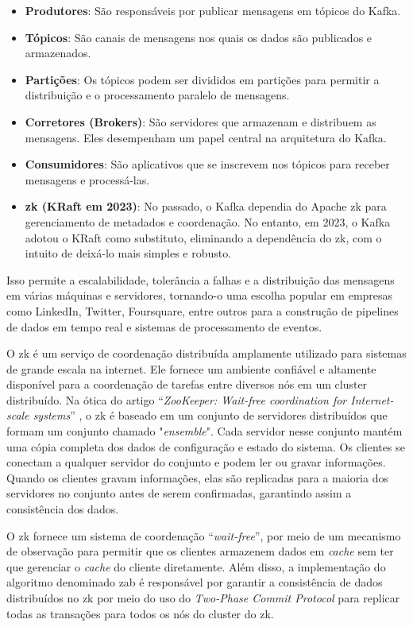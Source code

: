 \begin{itemize}
  \item \textbf{Produtores}: São responsáveis por publicar mensagens em tópicos do Kafka.
  \item \textbf{Tópicos}: São canais de mensagens nos quais os dados são publicados e armazenados.
  \item \textbf{Partições}: Os tópicos podem ser divididos em partições para permitir a distribuição e o processamento paralelo de mensagens.
  \item \textbf{Corretores (Brokers)}: São servidores que armazenam e distribuem as mensagens. Eles desempenham um papel central na arquitetura do Kafka.
  \item \textbf{Consumidores}: São aplicativos que se inscrevem nos tópicos para receber mensagens e processá-las.
  \item \textbf{\gls{zk} (KRaft em 2023)}: No passado, o Kafka dependia do Apache \gls{zk} para gerenciamento de metadados e coordenação. No entanto, em 2023, o Kafka adotou o KRaft como substituto, eliminando a dependência do \gls{zk}, com o intuito de deixá-lo mais simples e robusto.
\end{itemize}
Isso permite a escalabilidade, tolerância a falhas e a distribuição das mensagens em várias máquinas e servidores, tornando-o uma escolha popular em empresas como LinkedIn, Twitter, Foursquare, entre outros para a construção de pipelines de dados em tempo real e sistemas de processamento de eventos.

O \gls{zk} \cite{ZookeeperGitHub} é um serviço de coordenação distribuída amplamente utilizado para sistemas de grande escala na internet. Ele fornece um ambiente confiável e altamente disponível para a coordenação de tarefas entre diversos nós em um cluster distribuído. Na ótica do artigo ``\textit{ZooKeeper: Wait-free coordination for Internet-scale systems}'' \cite{ZooKeeperWaitFree:2010}, o \gls{zk} é baseado em um conjunto de servidores distribuídos que formam um conjunto chamado "\textit{ensemble}". Cada servidor nesse conjunto mantém uma cópia completa dos dados de configuração e estado do sistema. Os clientes se conectam a qualquer servidor do conjunto e podem ler ou gravar informações. Quando os clientes gravam informações, elas são replicadas para a maioria dos servidores no conjunto antes de serem confirmadas, garantindo assim a consistência dos dados. 

O \gls{zk} fornece um sistema de coordenação ``\textit{wait-free}'', por meio de um mecanismo de observação para permitir que os clientes armazenem dados em \textit{cache} sem ter que gerenciar o \textit{cache} do cliente diretamente. Além disso, a implementação do algoritmo denominado \gls{zab} é responsável por garantir a consistência de dados distribuídos no \gls{zk} por meio do uso do \textit{Two-Phase Commit Protocol} para replicar todas as transações para todos os nós do cluster do \gls{zk}\cite{CloudKarafkaZAB}.

